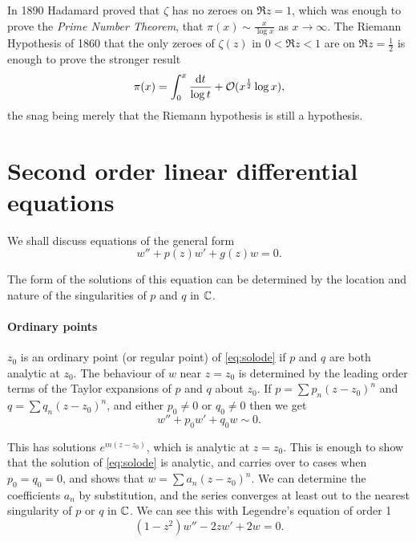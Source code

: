 \documentclass{notes}
\newcommand{\cO}{\mathcal{O}}
\theoremstyle{plain}
\begin{document}
In 1890 Hadamard proved that $\zeta$ has no zeroes on $\Re z = 1$, which
was enough to prove the \emph{Prime Number Theorem}, that
$\pi(x) \sim \frac{x}{\log x}$ as $x \to \infty$.  The Riemann Hypothesis
of 1860 that the only zeroes of $\zeta(z)$ in $0 < \Re z < 1$ are on
$\Re z = \frac{1}{2}$ is enough to prove the stronger result
\[
\pi(x) = \int_0^x \frac{\ud t}{\log t} + \cO (x^{\frac{1}{2}} \log x),
\]
the snag being merely that the Riemann hypothesis is still a hypothesis.

\chapter[Second order linear ODE\lowercase{s}]%
{Second order linear differential equations}

We shall discuss equations of the general form
\begin{equation}\label{eq:solode}
w'' + p(z) w' + g(z) w = 0.
\end{equation}

The form of the solutions of this equation can be determined by the location
and nature of the singularities of $p$ and $q$ in $\mathbb{C}$.

\subsubsection*{Ordinary points}

$z_0$ is an ordinary point (or regular point) of \eqref{eq:solode} if
$p$ and $q$ are both analytic at $z_0$.  The behaviour of $w$ near
$z=z_0$ is determined by the leading order terms of the Taylor expansions
of $p$ and $q$ about $z_0$.  If $p = \sum p_n (z-z_0)^n$ and $q
= \sum q_n (z-z_0)^n$, and either $p_0 \neq 0$ or $q_0 \neq 0$ then we get
\begin{equation}\label{eq:lotode}
w'' + p_0 w' + q_0 w \sim 0.
\end{equation}

This has solutions $e^{m (z-z_0)}$, which is analytic at $z=z_0$.  This is
enough to show that the solution of \eqref{eq:solode} is analytic, and
carries over to cases when $p_0 = q_0 = 0$, and shows
that $w = \sum a_n (z-z_0)^n$.  We can determine the coefficients $a_n$
by substitution, and the series converges at least out to the nearest
singularity of $p$ or $q$ in $\mathbb{C}$.  We can see this with Legendre's
equation of order 1
\begin{equation}\label{eq:legone}
(1-z^2) w'' - 2 z w' + 2 w = 0.
\end{equation}
\end{document}
